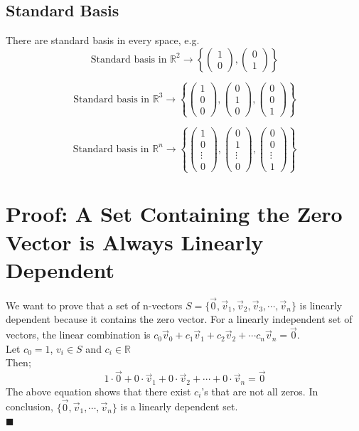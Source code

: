 \documentclass[11pt]{article}
\begin{document}
\subsection{Standard Basis}
There are standard basis in every space, e.g. 
\[
\text{Standard basis in }
\mathbb{R}^2
\rightarrow
\left\{
\begin{pmatrix}
1\\0
\end{pmatrix}, 
\begin{pmatrix}
0 \\1
\end{pmatrix}
\right\}
\]

\[
\text{Standard basis in }
\mathbb{R}^3
\rightarrow
\left\{
\begin{pmatrix}
1 \\0 \\0
\end{pmatrix},
\begin{pmatrix}
0\\1\\0
\end{pmatrix},
\begin{pmatrix}
0\\0\\1
\end{pmatrix}
\right\}
\]

\[
\text{Standard basis in }
\mathbb{R}^n
\rightarrow
\left\{
\begin{pmatrix}
1\\0\\ \vdots \\0
\end{pmatrix},
\begin{pmatrix}
0\\1\\ \vdots \\ 0
\end{pmatrix},
\begin{pmatrix}
0\\0\\ \vdots \\ 1
\end{pmatrix}
\right\}
\]
\section{Proof: A Set Containing the Zero Vector is Always Linearly Dependent}
We want to prove that a set of n-vectors $S = \{\vec 0,\vec  v_1, \vec v_2, \vec v_3, \cdots, \vec v_n \}$ is linearly dependent because it contains the zero vector. For a linearly independent set of vectors, the linear combination is $c_0 \vec v_0 + c_1 \vec v_1 + c_2 \vec v_2 + \cdots c_n \vec v_n = \vec 0$.\\[0.15in]
Let $c_0 = 1$, $v_i \in S$ and $c_i \in \mathbb{R}$\\[0.15in]
Then; 
\[
	1\cdot \vec 0 + 0 \cdot \vec v_1 + 0 \cdot \vec v_2 + \cdots + 0 \cdot \vec v_n = \vec 0
\]
The above equation shows that  there exist $c_i$'s that are not all zeros. In conclusion, $\{\vec 0, \vec v_1, \cdots , \vec v_n\}$ is a linearly dependent set.\\[0.15in]
\hfill $\blacksquare$
\end{document}
